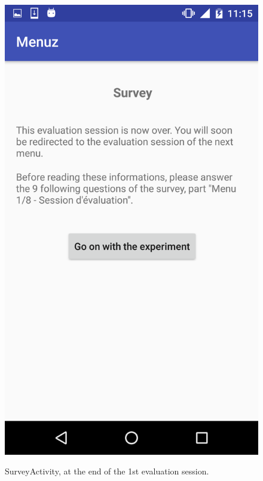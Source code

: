 \begin{figure}[!ht]
  \begin{center}
    \includegraphics[scale=0.22]{img/survey_activity.png}
    \label{fig:survey_activity}
    \caption{SurveyActivity, at the end of the 1st evaluation session.}
  \end{center}
\end{figure}

\newpage

